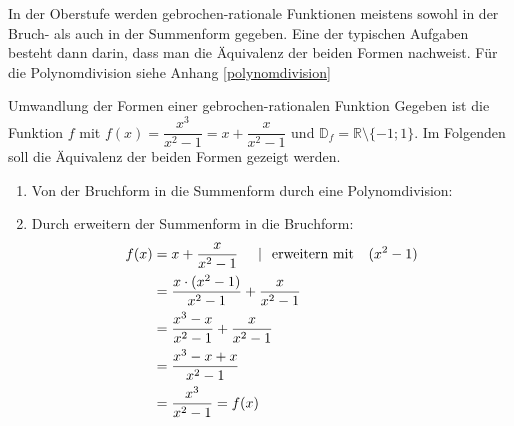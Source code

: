  In der Oberstufe werden gebrochen-rationale Funktionen meistens sowohl in der Bruch- als auch in der Summenform gegeben. Eine der typischen Aufgaben besteht dann darin, dass man die Äquivalenz der beiden Formen nachweist. Für die Polynomdivision siehe Anhang \ref{polynomdivision}  


 \begin{bsp}{Umwandlung der Formen einer gebrochen-rationalen Funktion}{}
Gegeben ist die Funktion $f$ mit $f(x) = \dfrac{x^3}{x^2-1} = x+ \dfrac{x}{x^2-1}$ und $\mathds{D}_f = \mathds{R}\setminus\{-1; 1\}$. Im Folgenden soll die Äquivalenz der beiden Formen gezeigt werden.
\begin{enumerate}
    \item Von der Bruchform in die Summenform durch eine Polynomdivision:\\ 
    \item Durch erweitern der Summenform in die Bruchform: 
\begin{equation*}
    \begin{split}
        f(x) &= x+\dfrac{x}{x^2-1} \hspace{0.5cm} |\hspace{0.25cm} \text{erweitern mit } \hspace{0.25cm} (x^2-1)\\
        &= \dfrac{x\cdot (x^2-1)}{x^2-1} + \dfrac{x}{x^2-1}\\
        &= \dfrac{x^3-x}{x^2-1} + \dfrac{x}{x^2-1}\\
        &= \dfrac{x^3-x+x}{x^2-1} \\
        &= \dfrac{x^3}{x^2-1} = f(x)
    \end{split}
\end{equation*}
\end{enumerate}
\end{bsp}

